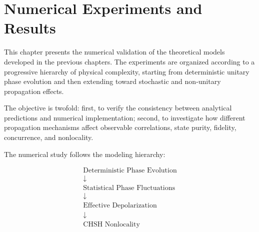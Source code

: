 
\chapter{Numerical Experiments and Results}
\label{ch:numerical_experiments}

This chapter presents the numerical validation of the theoretical models developed in the previous chapters. The experiments are organized according to a progressive hierarchy of physical complexity, starting from deterministic unitary phase evolution and then extending toward stochastic and non-unitary propagation effects.

The objective is twofold: first, to verify the consistency between analytical predictions and numerical implementation; second, to investigate how different propagation mechanisms affect observable correlations, state purity, fidelity, concurrence, and nonlocality.

The numerical study follows the modeling hierarchy:

\[
\begin{array}{c}
\text{Deterministic Phase Evolution}
\\
\downarrow
\\
\text{Statistical Phase Fluctuations}
\\
\downarrow
\\
\text{Effective Depolarization}
\\
\downarrow
\\
\text{CHSH Nonlocality}
\end{array}
\]





